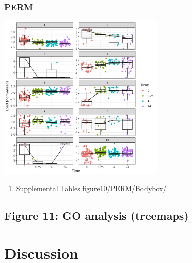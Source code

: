 \documentclass[11pt]{article}
\begin{document}
\subsubsection{PERM}
\label{sec:org87a18f0}
\begin{center}
\includegraphics[width=0.6\textwidth]{figure10/PERM/Bodybox.png}
\end{center}
\begin{enumerate}
\item Supplemental Tables
\label{sec:orga0a7bff}
\url{figure10/PERM/Bodybox/}
\end{enumerate}
\subsection{Figure 11: GO analysis (treemaps)}
\label{sec:org6a2089e}

\section{Discussion}
\label{sec:orgd8ac333}
\end{document}
